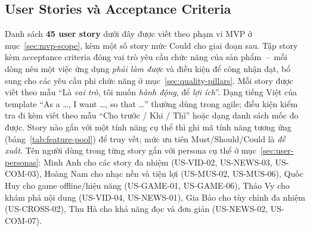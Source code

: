 \subsection{User Stories và Acceptance Criteria}
\label{sec:user-stories}

Danh sách \textbf{45 user story} dưới đây được viết theo phạm vi MVP ở mục~\ref{sec:mvp-scope}, kèm một số story mức Could cho giai đoạn sau. Tập story kèm acceptance criteria đóng vai trò yêu cầu chức năng của sản phẩm~--~mỗi dòng nêu một việc ứng dụng \textit{phải làm được} và điều kiện để công nhận đạt, bổ sung cho các yêu cầu phi chức năng ở mục~\ref{sec:quality-pillars}. Mỗi story được viết theo mẫu ``Là \textit{vai trò}, tôi muốn \textit{hành động}, để \textit{lợi ích}''. Dạng tiếng Việt của template ``As a \ldots{}, I want \ldots{}, so that \ldots{}'' thường dùng trong agile; điều kiện kiểm tra đi kèm viết theo mẫu ``Cho trước / Khi / Thì'' hoặc dạng danh sách mốc đo được. Story nào gắn với một tính năng cụ thể thì ghi mã tính năng tương ứng (bảng~\ref{tab:feature-pool}) để truy vết; mức ưu tiên Must/Should/Could là \textit{đề xuất}. Tên người dùng trong từng story gắn với persona cụ thể ở mục~\ref{sec:user-personas}: Minh Anh cho các story đa nhiệm (US-VID-02, US-NEWS-03, US-COM-03), Hoàng Nam cho nhạc nền và tiện lợi (US-MUS-02, US-MUS-06), Quốc Huy cho game offline/hiệu năng (US-GAME-01, US-GAME-06), Thảo Vy cho khám phá nội dung (US-VID-04, US-NEWS-01), Gia Bảo cho tùy chỉnh đa nhiệm (US-CROSS-02), Thu Hà cho khả năng đọc và đơn giản (US-NEWS-02, US-COM-07).

